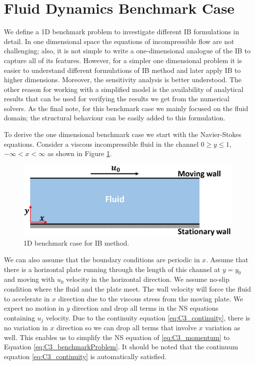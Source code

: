 \section{Fluid Dynamics Benchmark Case}\label{sec:C3_benchmark_case}
We define a 1D benchmark problem to investigate different IB formulations in detail. In one dimensional space the equations of incompressible flow are not challenging; also, it is not simple to write a one-dimensional analogue of the IB to capture all of its features. However, for a simpler one dimensional problem it is easier to understand different formulations of IB method and later apply IB to higher dimensions. Moreover, the sensitivity analysis is better understood. The other reason for working with a simplified model is the availability of analytical results that can be used for verifying the results we get from the numerical solvers. As the final note, for this benchmark case we mainly focused on the fluid domain; the structural behaviour can be easily added to this formulation.

To derive the one dimensional benchmark case we start with the Navier-Stokes equations. Consider a viscous incompressible fluid in the channel $0 \geq y \leq 1$, $-\infty < x < \infty$ as shown in Figure \ref{fig:C3_benchmarkCase}.

\begin{figure}[H]
    \centering
    \includegraphics[width=14.00cm]{Chapter_3/figure/C3_infinite_channel.png}
    \caption{1D benchmark case for IB method.}
    \label{fig:C3_benchmarkCase}
\end{figure}

We can also assume that the boundary conditions are periodic in $x$. Assume that there is a horizontal plate running through the length of this channel at $y=y_0$ and moving with $u_0$ velocity in the horizontal direction. We assume no-slip condition where the fluid and the plate meet. The wall velocity will force the fluid to accelerate in $x$ direction due to the viscous stress from the moving plate. We expect no motion in $y$ direction and drop all terms in the NS equations containing $u_j$ velocity. Due to the continuity equation \eqref{eq:C3_continuity}, there is no variation in $x$ direction so we can drop all terms that involve $x$ variation as well. This enables us to simplify the NS equation of \eqref{eq:C3_momentum} to Equation \eqref{eq:C3_benchmarkProblem}. It should be noted that the continuum equation \eqref{eq:C3_continuity} is automatically satisfied.

